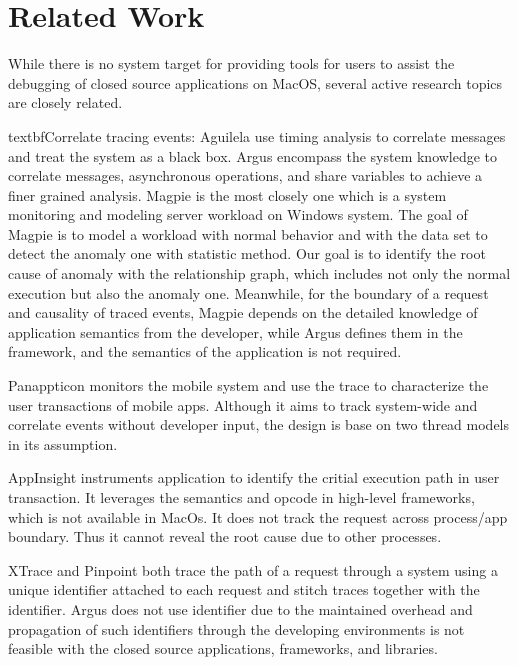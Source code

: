 \section{Related Work}
While there is no system target for providing tools for users to assist the debugging of closed source applications on MacOS, several active research topics are closely related.

textbf{Correlate tracing events:} Aguilela \cite{blackbox} use timing analysis to correlate messages and treat the system as a black box.
Argus encompass the system knowledge to correlate messages, asynchronous operations, and share variables to achieve a finer grained analysis.                                                                                                                       
Magpie \cite{magpie} is the most closely one which is a system monitoring and modeling server workload on Windows system.
The goal of Magpie is to model a workload with normal behavior and with the data set to detect the anomaly one with statistic method. 
Our goal is to identify the root cause of anomaly with the relationship graph, which includes not only the normal execution but also the anomaly one.
Meanwhile, for the boundary of a request and causality of traced events, Magpie depends on the detailed knowledge of application semantics from the developer, while Argus defines them in the framework, and the semantics of the application is not required.
                                                                                                                         
Panappticon \cite{pannappticon} monitors the mobile system and use the trace to characterize the user transactions of mobile apps. 
Although it aims to track system-wide and correlate events without developer input, the design is base on two thread models in its assumption. 

AppInsight \cite{appinsight} instruments application to identify the critial execution path in user transaction.         
It leverages the semantics and opcode in high-level frameworks, which is not available in MacOs.                         
It does not track the request across process/app boundary. Thus it cannot reveal the root cause due to other processes.      
                                                                                                                         
XTrace and Pinpoint \cite{xtrace, pinpoint} both trace the path of a request through a system using a unique identifier attached to each request and stitch traces together with the identifier.
Argus does not use identifier due to the maintained overhead and propagation of such identifiers through the developing environments is not feasible with the closed source applications, frameworks, and libraries.
                                                                                                                         
